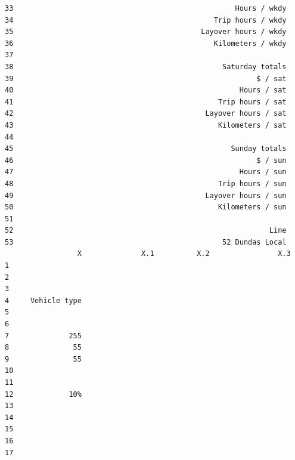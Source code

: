 \documentclass[
11pt, %
oneside, %
english, %
singlespacing, %
]{macthesis} %
\begin{document}
\begin{verbatim}
33                                                    Hours / wkdy
34                                               Trip hours / wkdy
35                                            Layover hours / wkdy
36                                               Kilometers / wkdy
37                                                                
38                                                 Saturday totals
39                                                         $ / sat
40                                                     Hours / sat
41                                                Trip hours / sat
42                                             Layover hours / sat
43                                                Kilometers / sat
44                                                                
45                                                   Sunday totals
46                                                         $ / sun
47                                                     Hours / sun
48                                                Trip hours / sun
49                                             Layover hours / sun
50                                                Kilometers / sun
51                                                                
52                                                            Line
53                                                 52 Dundas Local
                 X              X.1          X.2                X.3
1                                                                  
2                                                                  
3                                                                  
4     Vehicle type                                                 
5                                                                  
6                                                                  
7              255                                                 
8               55                                                 
9               55                                                 
10                                                                 
11                                                                 
12             10%                                                 
13                                                                 
14                                                                 
15                                                                 
16                                                                 
17                                                                 

\end{verbatim}
\end{document}
